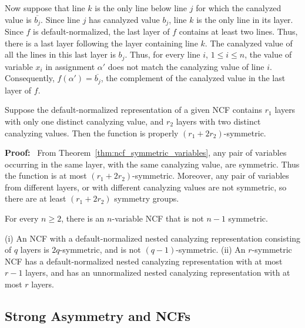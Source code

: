 Now suppose that line $k$ is the only line below line $j$ for which
the canalyzed value is $\overline{b_j}$.  Since line $j$ has
canalyzed value $b_j$, line $k$ is the only line in its layer.
Since $f$ is default-normalized, the last layer of $f$ contains at least
two lines.  Thus, there is a last layer following the layer containing
line $k$.  The canalyzed value of all the lines in this last layer
is $b_j$.  Thus, for every line $i$, $1 \leq i \leq n$, the value
of variable $x_i$ in assignment $\alpha'$ does not match the
canalyzing value of line $i$.  Consequently, $f(\alpha') =
\overline{b_j}$, the complement of the canalyzed value in the last
layer of $f$.  \QED

\begin{theorem}\label{thm:ncf_r_symmetric}
Suppose the default-normalized representation of a given NCF contains 
$r_1$ layers with only one distinct canalyzing value,
and $r_2$ layers with two distinct canalyzing values.
Then the function is properly $(r_1 + 2 r_2)$-symmetric.
\end{theorem}

\noindent
\textbf{Proof:}~
From Theorem~\ref{thm:ncf_symmetric_variables}, 
any pair of variables occurring in the same layer, 
with the same canalyzing value, are symmetric.
Thus the function is at most $(r_1 + 2 r_2)$-symmetric.
Moreover, any pair of variables from different layers, or with different canalyzing values
are not symmetric, so there are at least $(r_1 + 2 r_2)$ symmetry groups.
\QED

\begin{corollary}\label{cor:ncf_not_rsymm}
For every $n \geq 2$, there is an $n$-variable NCF that is not $n-1$ symmetric.
\end{corollary}

\begin{corollary}\label{cor:ncf_r_symmetric_layers}
(i) An NCF with a default-normalized nested canalyzing representation consisting
of $q$ layers is $2q$-symmetric, and is not $(q-1)$-symmetric.
(ii) An $r$-symmetric NCF has a default-normalized nested canalyzing representation
with at most $r-1$ layers, and has an unnormalized nested canalyzing
representation with at most $r$ layers.  
\end{corollary}

\subsection{Strong Asymmetry and NCFs}
\label{sse:strong_asym_ncf}

